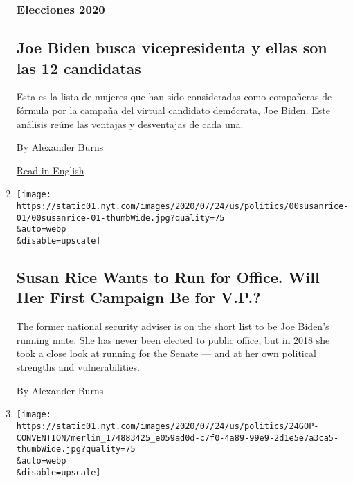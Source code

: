 \begin{enumerate}
  \hypertarget{elecciones-2020-1}{%
  \subsubsection{Elecciones 2020}\label{elecciones-2020-1}}

  \hypertarget{joe-biden-busca-vicepresidenta-y-ellas-son-las-12-candidatas}{%
  \subsection{Joe Biden busca vicepresidenta y ellas son las 12
  candidatas}\label{joe-biden-busca-vicepresidenta-y-ellas-son-las-12-candidatas}}

  Esta es la lista de mujeres que han sido consideradas como compañeras
  de fórmula por la campaña del virtual candidato demócrata, Joe Biden.
  Este análisis reúne las ventajas y desventajas de cada una.

  By Alexander Burns

  \href{https://www.nytimes.com/article/biden-vice-president-2020.html}{Read
  in English}
\item
  \href{/2020/07/27/us/politics/susan-rice-biden-vice-president.html}{}

  \texttt{[image: https://static01.nyt.com/images/2020/07/24/us/politics/00susanrice-01/00susanrice-01-thumbWide.jpg?quality=75\\\&auto=webp\\\&disable=upscale]}

  \hypertarget{susan-rice-wants-to-run-for-office-will-her-first-campaign-be-for-vp}{%
  \subsection{Susan Rice Wants to Run for Office. Will Her First
  Campaign Be for
  V.P.?}\label{susan-rice-wants-to-run-for-office-will-her-first-campaign-be-for-vp}}

  The former national security adviser is on the short list to be Joe
  Biden's running mate. She has never been elected to public office, but
  in 2018 she took a close look at running for the Senate --- and at her
  own political strengths and vulnerabilities.

  By Alexander Burns
\item
  \href{/2020/07/24/us/politics/trump-republican-convention-canceled-jacksonville.html}{}

  \texttt{[image: https://static01.nyt.com/images/2020/07/24/us/politics/24GOP-CONVENTION/merlin\_174883425\_e059ad0d-c7f0-4a89-99e9-2d1e5e7a3ca5-thumbWide.jpg?quality=75\\\&auto=webp\\\&disable=upscale]}


\end{enumerate}
